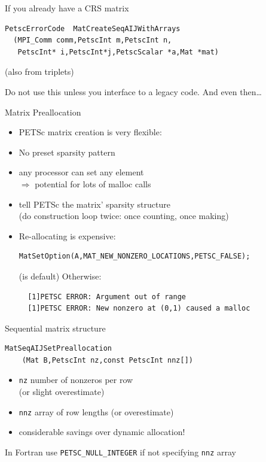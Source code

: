 \begin{longstory}

\begin{numberedframe}{If you already have a CRS matrix}
\begin{lstlisting}
PetscErrorCode  MatCreateSeqAIJWithArrays
  (MPI_Comm comm,PetscInt m,PetscInt n,
   PetscInt* i,PetscInt*j,PetscScalar *a,Mat *mat)
\end{lstlisting}
(also from triplets)

Do not use this unless you interface to a legacy code. And even then\ldots
\end{numberedframe}

\begin{numberedframe}{Matrix Preallocation}

  \begin{itemize}
  \item PETSc matrix creation is very flexible:
  \item No preset sparsity pattern
  \item any processor can set any element\\
    $\Rightarrow$ potential for lots of malloc calls
  \item tell PETSc the matrix' sparsity structure\\ (do construction
    loop twice: once counting, once making)
  \item Re-allocating is expensive:
\begin{lstlisting}
MatSetOption(A,MAT_NEW_NONZERO_LOCATIONS,PETSC_FALSE);
\end{lstlisting}
  (is default) Otherwise:
\begin{verbatim}
  [1]PETSC ERROR: Argument out of range
  [1]PETSC ERROR: New nonzero at (0,1) caused a malloc
\end{verbatim}
  \end{itemize}

\end{numberedframe}

\begin{numberedframe}{Sequential matrix  structure}
\begin{lstlisting}
MatSeqAIJSetPreallocation
    (Mat B,PetscInt nz,const PetscInt nnz[])
\end{lstlisting}
  \begin{itemize}
  \item \lstinline{nz} number of nonzeros per row\\ (or slight overestimate)
  \item \lstinline{nnz} array of row lengths (or overestimate)
  \item considerable savings over dynamic allocation!
  \end{itemize}
In Fortran use \lstinline{PETSC_NULL_INTEGER} if not specifying \lstinline{nnz} array
\end{numberedframe}


\end{longstory}
